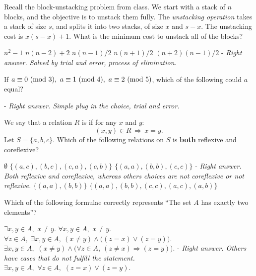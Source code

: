 \begin{questions}
\vspace{1.8in}

\question Recall the block-unstacking problem from class. 
We start with a stack of $n$ blocks, and the objective is to unstack them fully. 
The \emph{unstacking operation} takes a stack of size $s$, and splits it into two stacks, of size $x$ and $s-x$. 
The unstacking cost is $x(s-x) + 1$.  What is the minimum cost to unstack all of the blocks? 
\begin{choices}
\choice $n^2-1$
\choice $n(n-2) + 2$
\choice $n(n-1)/2$ 
\choice $n(n+1)/2$
\choice $(n+2)(n-1)/2$ - \textit{Right answer. Solved by trial and error, process of elimination.}
\end{choices}

\newpage

\question If $a \equiv 0 \Mod 3,\ a \equiv 1 \Mod 4,\ a \equiv 2 \Mod 5$, which of the following could $a$ equal?
\begin{choices}
 - \textit{Right answer. Simple plug in the choice, trial and error.}
\end{choices}

\vspace{1.8in}

\question We say that a relation $R$ is  if for any $x$ and $y$: 
$$ %
(x,y)\in R \, \Rightarrow\,  x=y.$$  
Let $S = \{a, b, c\}$.  Which of the following relations on $S$ is
{\bf both} reflexive and coreflexive?
\begin{choices}
\choice $\emptyset$
\choice $\{(a,c),(b,c),(c,a),(c,b)\}$
\choice $\{(a,a),(b,b),(c,c)\}$ - \textit{Right answer. Both reflexive and coreflexive, whereas others choices are not coreflexive or not reflexive.}
\choice $\{(a,a),(b,b)\}$
\choice $\{(a,a),(b,b),(c,c),(a,c),(a,b)\}$
\end{choices}

\newpage

\question Which of the following formulae correctly represents ``The set $A$ has exactly two elements''?
\begin{choices}
\choice $\exists x,y\in A,\,\, x\neq y$.
\choice $\forall x,y\in A,\,\, x\neq y$.
\choice $\forall z\in A,\,\, \exists x,y\in A,\ (x\neq y)\land \big( (z=x) \lor (z=y) \big)$.
\choice $\exists x,y\in A,\,\, (x\neq y)\land \big(\forall z\in A,\ (z\neq x) \Rightarrow (z=y)\big)$. - \textit{Right answer. Others have cases that do not fulfill the statement.}
\choice $\exists x,y\in A,\,\, \forall z\in A,\,\, (z=x) \lor (z=y)$.
\end{choices}


\end{questions}
